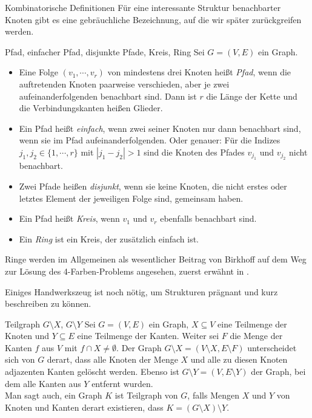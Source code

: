 \begin{section}{Kombinatorische Definitionen}
  Für eine interessante Struktur benachbarter Knoten gibt es eine gebräuchliche Bezeichnung, auf die wir später zurückgreifen werden.
  
  \begin{definition}{Pfad, einfacher Pfad, disjunkte Pfade, Kreis, Ring}
  Sei $G=(V,E)$ ein Graph.
   \begin{itemize}
    \item Eine Folge $(v_1,\cdots,v_r)$ von mindestens drei Knoten heißt \textit{Pfad}, wenn die auftretenden Knoten paarweise verschieden, aber je zwei aufeinanderfolgenden benachbart sind. Dann ist $r$ die Länge der Kette und die Verbindungskanten heißen Glieder.
    \item Ein Pfad heißt \textit{einfach}, wenn zwei seiner Knoten nur dann benachbart sind, wenn sie im Pfad aufeinanderfolgenden. Oder genauer: Für die Indizes $j_1, j_2 \in \{1,\cdots,r\}$ mit $|j_1 - j_2| > 1$ sind die Knoten des Pfades $v_{j_1}$ und $v_{j_2}$ nicht benachbart.
    \item Zwei Pfade heißen \textit{disjunkt}, wenn sie keine Knoten, die nicht erstes oder letztes Element der jeweiligen Folge sind, gemeinsam haben. 
    \item Ein Pfad heißt \textit{Kreis}, wenn $v_1$ und $v_r$ ebenfalls benachbart sind.
    \item Ein \textit{Ring} ist ein Kreis, der zusätzlich einfach ist.
   \end{itemize}
  \end{definition}
  
  Ringe werden im Allgemeinen als wesentlicher Beitrag von Birkhoff auf dem Weg zur Lösung des 4-Farben-Problems angesehen, zuerst erwähnt in \cite{AmJMath35}.

  Einiges Handwerkszeug ist noch nötig, um Strukturen prägnant und kurz beschreiben zu können.
  
  \begin{definition}{Teilgraph $G\setminus X$, $G\setminus Y$}
   Sei $G=(V,E)$ ein Graph, $X \subseteq V$ eine Teilmenge der Knoten und $Y \subseteq E$ eine Teilmenge der Kanten. Weiter sei $F$ die Menge der Kanten $f$ aus $V$ mit $f \cap X \neq \emptyset$. Der Graph $G\setminus X = (V\setminus X,E\setminus F)$ unterscheidet sich von $G$ derart, dass alle Knoten der Menge $X$ und alle zu diesen Knoten adjazenten Kanten gelöscht werden. Ebenso ist $G\setminus Y = (V,E\setminus Y)$ der Graph, bei dem alle Kanten aus $Y$ entfernt wurden.\\
   Man sagt auch, ein Graph $K$ ist Teilgraph von $G$, falls Mengen $X$ und $Y$ von Knoten und Kanten derart existieren, dass $K = (G \setminus X) \setminus Y$.
  \end{definition}
  

\end{section}
